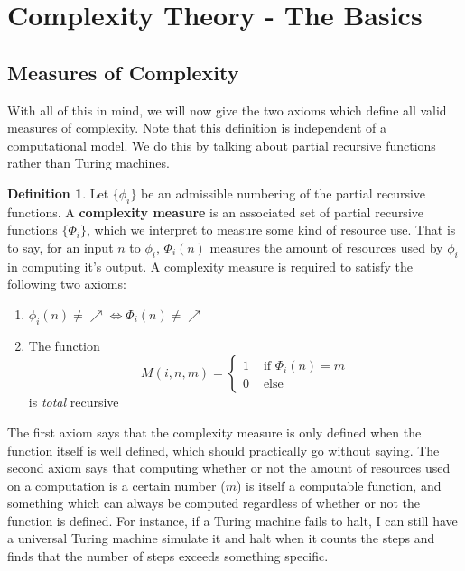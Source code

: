 \documentclass{article}
\theoremstyle{definition}
\newtheorem{definition}{Definition}[section]
\theoremstyle{plain}
\theoremstyle{theorem}
\begin{document}
\section{Complexity Theory - The Basics}
\subsection{Measures of Complexity}
\par With all of this in mind, we will now give the two axioms which define all valid measures of complexity. Note that this definition is independent of a computational model. We do this by talking about partial recursive functions rather than Turing machines. 
\begin{definition}
    Let $\{\phi_i\}$ be an admissible numbering of the partial recursive functions. A \textbf{complexity measure} is an associated set of partial recursive functions $\{\Phi_i\}$, which we interpret to measure some kind of resource use. That is to say, for an input $n$ to $\phi_i$, $\Phi_i(n)$ measures the amount of resources used by $\phi_i$ in computing it's output. A complexity measure is required to satisfy the following two axioms:
    \begin{enumerate}
        \item $\phi_i(n) \neq \nearrow \iff \Phi_i(n) \neq \nearrow$
        \item The function
        \[ M(i,n,m) = \begin{cases}
                          1 & \textrm{ if $\Phi_i(n)=m$} \\
                          0 & \textrm{ else}
                      \end{cases}\]
        is \textit{total} recursive
    \end{enumerate}
\end{definition}
\par The first axiom says that the complexity measure is only defined when the function itself is well defined, which should practically go without saying. The second axiom says that computing whether or not the amount of resources used on a computation is a certain number ($m$) is itself a computable function, and something which can always be computed regardless of whether or not the function is defined. For instance, if a Turing machine fails to halt, I can still have a universal Turing machine simulate it and halt when it counts the steps and finds that the number of steps exceeds something specific.
\end{document}
